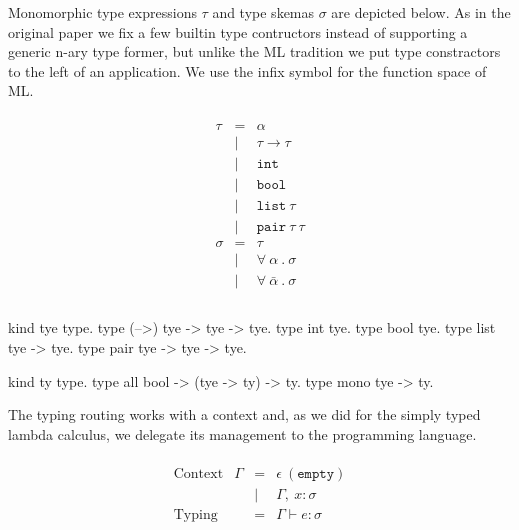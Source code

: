 \documentclass[a4paper, 11pt]{book}
\begin{document}
Monomorphic type expressions $\tau$ and type skemas $\sigma$
are depicted below. As in the original paper we fix a few builtin type contructors
instead of supporting a generic n-ary type former, but unlike
the ML tradition we put type constractors to the left of an application.
We use the infix symbol \elpi{-->} for the function space of ML.

\begin{center}
\begin{minipage}{0.4\textwidth}
$$
\begin{array}{lrl}
  \\
    \tau   &=     & \alpha                    \\
                              &\vert &  \tau \to \tau         \\
                              &\vert &  \mathtt{int}         \\
                              &\vert &  \mathtt{bool}         \\
                              &\vert &  \mathtt{list}\ \tau         \\
                              &\vert &  \mathtt{pair}\ \tau\ \tau         \\
  
     \sigma &=    & \tau                                           \\
                             &\vert& \forall\ \alpha\ .\ \sigma \\
                            &\vert& \forall\ \bar\alpha\ .\ \sigma \\
  \\
\end{array}
$$
\end{minipage}
\begin{minipage}{0.5\textwidth}
\begin{elpicodelj}
kind tye   type.
type (-->) tye -> tye -> tye.  
type int   tye.
type bool  tye.
type list  tye -> tye.
type pair  tye -> tye -> tye.

kind ty     type.
type all    bool -> (tye -> ty) -> ty.
type mono   tye -> ty.
\end{elpicodelj}
\end{minipage}
\end{center}


The typing routing works with a context and, as we did for the
simply typed lambda calculus, we delegate its management to the
programming language.

$$
\begin{array}{llrl}
  \\
    \text{Context}     & \Gamma & = & \epsilon\ \mathtt{(empty)}\\
                       &        & \vert& \Gamma,\ x : \sigma\\
    \text{Typing}      &        & = & \Gamma \vdash e : \sigma\\
  \\
  \end{array}
$$
\end{document}
